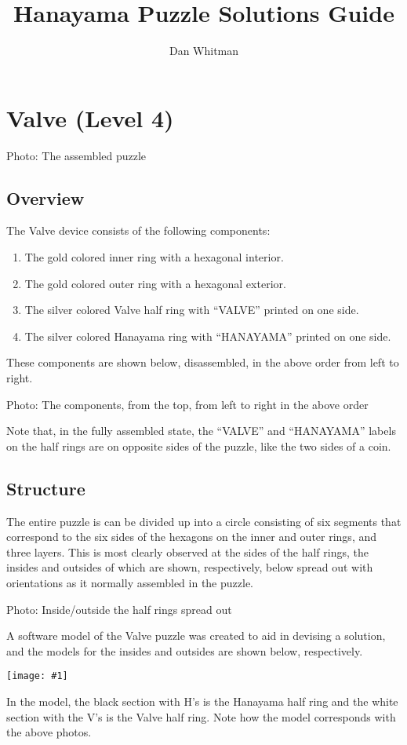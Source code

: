 \documentclass{article}
\newcommand{\diagram}[1]{
      \begin{center}
            \texttt{[image: \#1]}
      \end{center}
}
\newcommand{\photo}[1]{
      \begin{center}
            Photo: #1
      \end{center}
}
\begin{document}
\def\han{Hanayama}
\def\cc{counter-clockwise}

\title{\han{} Puzzle Solutions Guide}
\author{Dan Whitman}
\date{}

\maketitle

\section{Valve (Level 4)}

\photo{The assembled puzzle}

\subsection{Overview}

The Valve device consists of the following components:
\begin{enumerate}
      \item The gold colored inner ring with a hexagonal interior.
      \item The gold colored outer ring with a hexagonal exterior.
      \item The silver colored Valve half ring with ``VALVE'' printed on one side.
      \item The silver colored \han{} ring with ``HANAYAMA'' printed on one side.
\end{enumerate}
These components are shown below, disassembled, in the above order from left to right.
\photo{The components, from the top, from left to right in the above order}
Note that, in the fully assembled state, the ``VALVE'' and ``HANAYAMA'' labels on the half rings are on opposite sides of the puzzle, like the two sides of a coin.

\subsection{Structure}

The entire puzzle is can be divided up into a circle consisting of six segments that correspond to the six sides of the hexagons on the inner and outer rings, and three layers.
This is most clearly observed at the sides of the half rings, the insides and outsides of which are shown, respectively, below spread out with orientations as it normally assembled in the puzzle.
\photo{Inside/outside the half rings spread out}
A software model of the Valve puzzle was created to aid in devising a solution, and the models for the insides and outsides are shown below, respectively.
\diagram{halves-00}
In the model, the black section with H's is the \han{} half ring and the white section with the V's is the Valve half ring.
Note how the model corresponds with the above photos.
\end{document}
